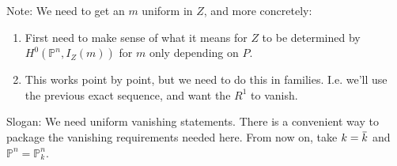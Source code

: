 Note: We need to get an \(m\) uniform in \(Z\), and more concretely:

\begin{enumerate}
\def\labelenumi{\arabic{enumi}.}
\tightlist
\item
  First need to make sense of what it means for \(Z\) to be determined
  by \(H^0({\mathbb{P}}^n, I_Z(m))\) for \(m\) only depending on \(P\).
\item
  This works point by point, but we need to do this in families. I.e.
  we'll use the previous exact sequence, and want the \(R^1\) to vanish.
\end{enumerate}

Slogan: We need uniform vanishing statements. There is a convenient way
to package the vanishing requirements needed here. From now on, take
\(k=\mkern 1.5mu\overline{\mkern-1.5muk\mkern-1.5mu}\mkern 1.5mu\) and
\({\mathbb{P}}^n = {\mathbb{P}}_k^n\).

